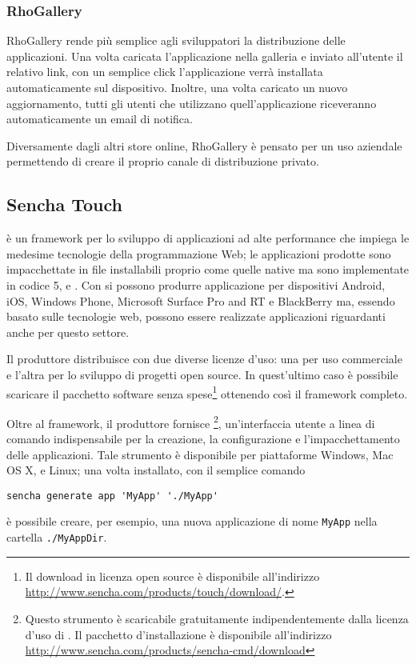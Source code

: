 			\subsubsection{RhoGallery}
				RhoGallery rende più semplice agli sviluppatori la distribuzione
				delle applicazioni. Una volta caricata l'applicazione nella
				galleria e inviato all'utente il relativo link, con un semplice
				click l'applicazione verrà installata automaticamente sul
				dispositivo. Inoltre, una volta caricato un nuovo aggiornamento,
				tutti gli utenti che utilizzano quell'applicazione riceveranno
				automaticamente un email di notifica.
				
				Diversamente dagli altri store online, RhoGallery è
				pensato per un uso aziendale permettendo di creare il proprio
				canale di distribuzione privato.


		\subsection{Sencha Touch}
			\senchat{} è un framework per lo sviluppo \crossplat{} di
			applicazioni ad	alte performance che impiega le medesime tecnologie
			della programmazione Web; le applicazioni prodotte sono
			impacchettate in file installabili proprio come quelle native ma
			sono implementate in codice \html{}5, \css{} e \js{}. Con \senchat{}
			si possono produrre applicazione per dispositivi Android, iOS,
			Windows Phone, Microsoft Surface Pro and RT e BlackBerry ma, essendo
			basato sulle tecnologie web, possono essere realizzate applicazioni
			riguardanti anche per questo settore.
			
			Il produttore distribuisce \senchat{} con due diverse licenze d'uso:
			una per uso commerciale e l'altra per lo sviluppo di progetti open 
			source. In quest'ultimo caso è possibile scaricare il pacchetto
			software senza spese\footnote{Il download in licenza open source è
			disponibile all'indirizzo \url{http://www.sencha.com/products/touch/download/}.}
			ottenendo così il framework completo.
			
			Oltre al framework, il produttore fornisce \senchacmd{}\footnote{
			Questo strumento è scaricabile gratuitamente indipendentemente dalla
			licenza d'uso di \senchat{}. Il pacchetto d'installazione è
			disponibile all'indirizzo \url{http://www.sencha.com/products/sencha-cmd/download}},
			un'interfaccia utente a linea di comando indispensabile per la
			creazione, la configurazione e l'impacchettamento delle applicazioni.
			Tale strumento è disponibile per piattaforme Windows, Mac OS X, e Linux;
			una volta installato, con il semplice comando
			\begin{lstlisting}[language=MyBash]
	sencha generate app 'MyApp' './MyApp'
			\end{lstlisting}
			è possibile creare, per esempio, una nuova applicazione di nome
			\verb|MyApp| nella cartella \verb|./MyAppDir|.
			
